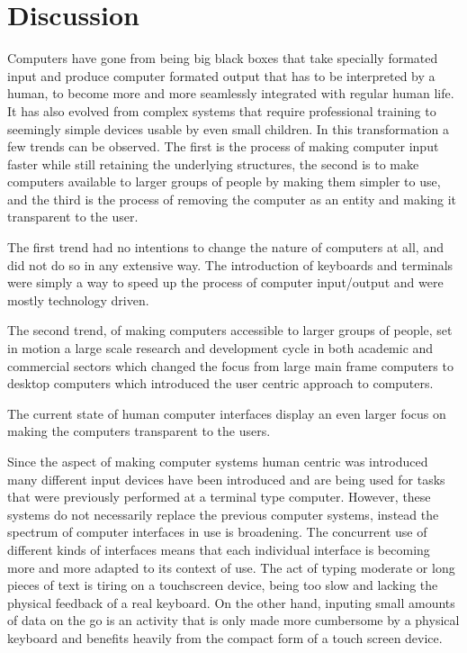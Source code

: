 \section{Discussion}


Computers have gone from being big black boxes that take specially formated input and produce computer formated output that has to be interpreted by a human, to become more and more seamlessly integrated with regular human life. It has also evolved from complex systems that require professional training to seemingly simple devices usable by even small children. In this transformation a few trends can be observed. The first is the process of making computer input faster while still retaining the underlying structures, the second is to make computers available to larger groups of people by making them simpler to use, and the third is the process of removing the computer as an entity and making it transparent to the user.

The first trend had no intentions to change the nature of computers at all, and did not do so in any extensive way. The introduction of keyboards and terminals were simply a way to speed up the process of computer input/output and were mostly technology driven. 

The second trend, of making computers accessible to larger groups of people, set in motion a large scale research and development cycle in both academic and commercial sectors which changed the focus from large main frame computers to desktop computers which introduced the user centric approach to computers.

The current state of human computer interfaces display an even larger focus on making the computers transparent to the users.

Since the aspect of making computer systems human centric was introduced many different input devices have been introduced and are being used for tasks that were previously performed at a terminal type computer. However, these systems do not necessarily replace the previous computer systems, instead the spectrum of computer interfaces in use is broadening. The concurrent use of different kinds of interfaces means that each individual interface is becoming more and more adapted to its context of use. The act of typing moderate or long pieces of text is tiring on a touchscreen device, being too slow and lacking the physical feedback of a real keyboard. On the other hand, inputing small amounts of data on the go is an activity that is only made more cumbersome by a physical keyboard and benefits heavily from the compact form of a touch screen device.

